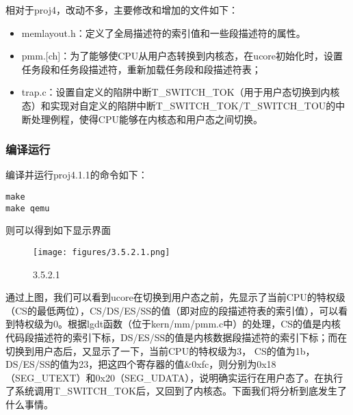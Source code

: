 相对于proj4，改动不多，主要修改和增加的文件如下：

\begin{itemize}
\item
  memlayout.h：定义了全局描述符的索引值和一些段描述符的属性。
\item
  pmm.{[}ch{]}：为了能够使CPU从用户态转换到内核态，在ucore初始化时，设置任务段和任务段描述符，重新加载任务段和段描述符表；
\item
  trap.c：设置自定义的陷阱中断T\_SWITCH\_TOK（用于用户态切换到内核态）和实现对自定义的陷阱中断T\_SWITCH\_TOK/T\_SWITCH\_TOU的中断处理例程，使得CPU能够在内核态和用户态之间切换。
\end{itemize}

\subsubsection{编译运行}\label{ux7f16ux8bd1ux8fd0ux884c}

编译并运行proj4.1.1的命令如下：

\begin{lstlisting}
make
make qemu
\end{lstlisting}

则可以得到如下显示界面

\begin{figure}[htbp]
\centering
\texttt{[image: figures/3.5.2.1.png]}
\caption{3.5.2.1}
\end{figure}

通过上图，我们可以看到ucore在切换到用户态之前，先显示了当前CPU的特权级（CS的最低两位），CS/DS/ES/SS的值（即对应的段描述符表的索引值），可以看到特权级为0。根据lgdt函数（位于kern/mm/pmm.c中）的处理，CS的值是内核代码段描述符的索引下标，DS/ES/SS的值是内核数据段描述符的索引下标；而在切换到用户态后，又显示了一下，当前CPU的特权级为3，
CS的值为1b，DS/ES/SS的值为23，把这四个寄存器的值\&0xfc，则分别为0x18（SEG\_UTEXT）和0x20（SEG\_UDATA），说明确实运行在用户态了。在执行了系统调用T\_SWITCH\_TOK后，又回到了内核态。下面我们将分析到底发生了什么事情。

